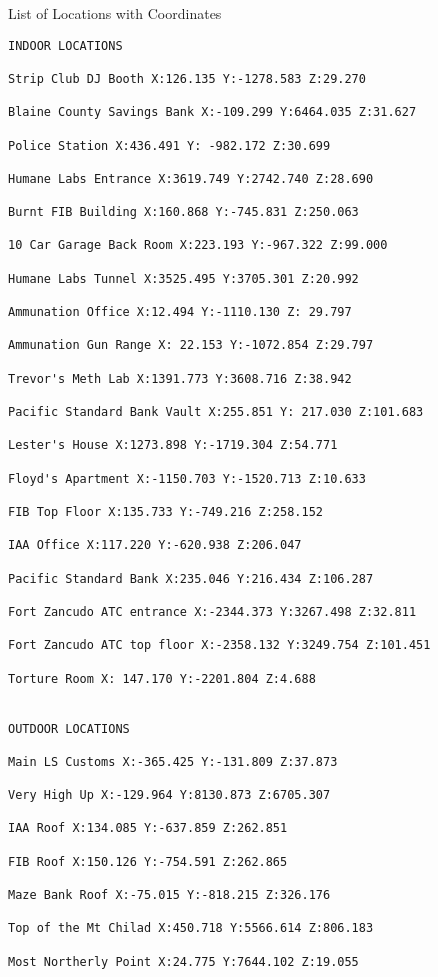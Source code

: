 \documentclass[
  openany]{book}
\begin{document}
List of Locations with Coordinates

\begin{verbatim}
INDOOR LOCATIONS
 
Strip Club DJ Booth X:126.135 Y:-1278.583 Z:29.270

Blaine County Savings Bank X:-109.299 Y:6464.035 Z:31.627

Police Station X:436.491 Y: -982.172 Z:30.699

Humane Labs Entrance X:3619.749 Y:2742.740 Z:28.690

Burnt FIB Building X:160.868 Y:-745.831 Z:250.063

10 Car Garage Back Room X:223.193 Y:-967.322 Z:99.000

Humane Labs Tunnel X:3525.495 Y:3705.301 Z:20.992

Ammunation Office X:12.494 Y:-1110.130 Z: 29.797

Ammunation Gun Range X: 22.153 Y:-1072.854 Z:29.797

Trevor's Meth Lab X:1391.773 Y:3608.716 Z:38.942

Pacific Standard Bank Vault X:255.851 Y: 217.030 Z:101.683

Lester's House X:1273.898 Y:-1719.304 Z:54.771

Floyd's Apartment X:-1150.703 Y:-1520.713 Z:10.633

FIB Top Floor X:135.733 Y:-749.216 Z:258.152

IAA Office X:117.220 Y:-620.938 Z:206.047

Pacific Standard Bank X:235.046 Y:216.434 Z:106.287

Fort Zancudo ATC entrance X:-2344.373 Y:3267.498 Z:32.811

Fort Zancudo ATC top floor X:-2358.132 Y:3249.754 Z:101.451

Torture Room X: 147.170 Y:-2201.804 Z:4.688

 
OUTDOOR LOCATIONS
 
Main LS Customs X:-365.425 Y:-131.809 Z:37.873

Very High Up X:-129.964 Y:8130.873 Z:6705.307

IAA Roof X:134.085 Y:-637.859 Z:262.851

FIB Roof X:150.126 Y:-754.591 Z:262.865

Maze Bank Roof X:-75.015 Y:-818.215 Z:326.176

Top of the Mt Chilad X:450.718 Y:5566.614 Z:806.183

Most Northerly Point X:24.775 Y:7644.102 Z:19.055


\end{verbatim}
\end{document}
